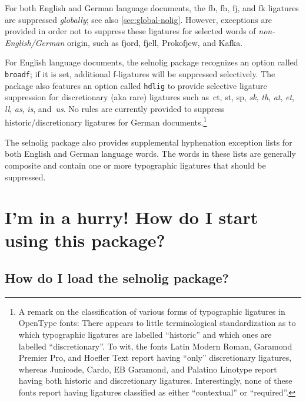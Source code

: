 \documentclass[11pt]{article}
\newcommand{\pkg}[1]{\textsf{#1}}
\newcommand{\opt}[1]{\texttt{#1}}
\begin{document}
For both English and German language documents, the {\ebg \mbox{fb}, \mbox{fh}, \mbox{fj}, and \mbox{fk}} ligatures are suppressed \emph{globally}; see also \cref{sec:global-nolig}. However, exceptions are provided in order not to suppress these ligatures for selected words of \emph{non-English\slash German} origin, such as {\ebg fjord, fjell, Prokofjew, and Kafka}.

For English language documents, the \pkg{selnolig} package recognizes an option called \opt{broadf}; if it is set, additional f-ligatures will be suppressed selectively. The package also features an option called \opt{hdlig} to provide selective ligature suppression for discretionary (aka rare) ligatures such as~ct, st, sp, {\ebg\emph{sk}}, \emph{th}, \emph{at}, \emph{et}, \emph{ll}, \emph{as}, \emph{is}, and~\emph{us}. No rules are currently provided to suppress historic\slash discretionary ligatures for German documents.\footnote{A remark on the classification of various forms of typographic ligatures in OpenType fonts: There appears to little terminological standardization as to which typographic ligatures are labelled \enquote{historic} and which ones are labelled \enquote{discretionary}. To wit, the fonts Latin Modern Roman, Garamond Premier Pro, and Hoefler Text report having \enquote{only} discretionary ligatures, whereas Junicode, Cardo, EB Garamond, and Palatino Linotype report having both historic and discretionary ligatures. Interestingly, none of these fonts report having ligatures classified as either \enquote{contextual} or \enquote{required}. }

The \pkg{selnolig} package also provides supplemental hyphenation exception lists for both English and German language words. The words in these lists are generally composite and contain one or more typographic ligatures that should be suppressed.



\section{I'm in a hurry! How do I start using this package?}

\subsection[How do I load the selnolig package?]{How do I load the \pkg{selnolig} package?}

\end{document}
